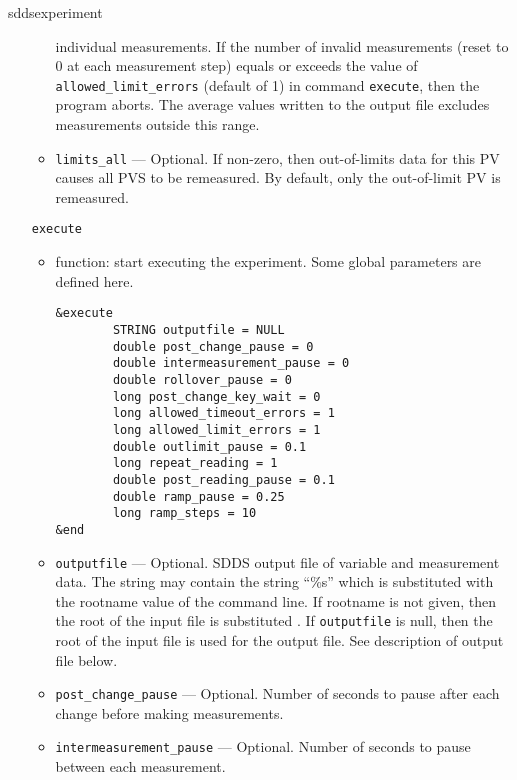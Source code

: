 \begin{sddsprog}{sddsexperiment}
\begin{itemize}
\begin{itemize}
                individual measurements. If the number of invalid measurements (reset to 0 at each
                measurement step) equals or exceeds the value
                of {\verb+allowed_limit_errors+} (default of 1) in command {\verb+execute+}, then the program aborts.
                The average values written to the output file excludes measurements outside this range.
    \item {\verb+limits_all+} --- Optional. If non-zero, then out-of-limits data for this PV causes
                all PVS to be remeasured. By default, only the out-of-limit PV is remeasured.
  \end{itemize}

\begin{latexonly}
\newpage\begin{center}{\Large \verb+execute+}\end{center}
\end{latexonly}
\begin{htmlonly}
  \item {\Large \verb+execute+}
\end{htmlonly}
  \begin{itemize}
    \item function: start executing the experiment. Some global parameters are defined here.
\begin{verbatim}
&execute
        STRING outputfile = NULL
        double post_change_pause = 0
        double intermeasurement_pause = 0
        double rollover_pause = 0
        long post_change_key_wait = 0
        long allowed_timeout_errors = 1
        long allowed_limit_errors = 1
        double outlimit_pause = 0.1
        long repeat_reading = 1
        double post_reading_pause = 0.1
        double ramp_pause = 0.25
        long ramp_steps = 10
&end
\end{verbatim}
    \item {\verb+outputfile+} --- Optional. SDDS output file of variable and measurement data. The string
                may contain the string ``\%s'' which is substituted with the rootname value
                of the command line. If rootname is not given, then the root of the input file
                is substituted . If {\verb+outputfile+} is null, then the root of the input file
                is used for the output file. See description of output file below.
    \item {\verb+post_change_pause+} ---  Optional. Number of seconds to pause after each change before
                making measurements.
    \item {\verb+intermeasurement_pause+} ---  Optional. Number of seconds to pause between each measurement.

\end{itemize}
\end{itemize}
\end{sddsprog}
